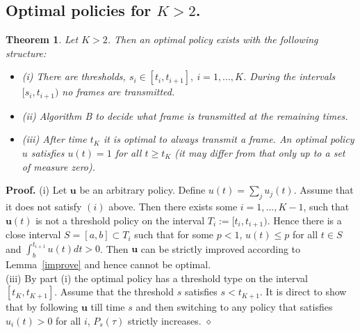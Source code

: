 \documentclass[10pt,twocolumn,conference,final]{IEEEtran}
\def\endpf{\hfill$\diamond$}
\newtheorem{thm}{Theorem}[section]
\newcommand{\ubf}{\mathbf u}
\begin{document}
\subsection{Optimal policies for $K>2$.}
\begin{thm}\label{res3}
Let $K > 2$. Then
an optimal policy exists with the following structure:
\begin{itemize}
\item
(i) There are thresholds, $s_i \in [t_i,t_{i+1}], \ i=1,...,K$. During the
intervals $[s_i,t_{i+1})$ no frames are transmitted.
\item
(ii)  Algorithm B
to decide what frame is transmitted at the remaining times.
\item
(iii) After time $t_K$ it is optimal to always transmit a frame.
An  optimal policy $u$ satisfies $u(t)=1$ for all $t\geq t_K$ (it may
differ from that only up to a set of measure zero).
\end{itemize}
\end{thm}
{\bf Proof.}
(i) Let $\ubf$ be an arbitrary policy.
Define $u(t)=\sum_j u_j(t) $.
Assume that it does not satisfy $(i)$ above.
Then there exists some $i=1,...,K-1$, such that
$\ubf(t)$ is not a threshold policy on the interval
$T_i := [t_i, t_{i+1})$. Hence there is a close interval
$S =[a,b]  \subset T_i$ such that for some $p<1$,
$u(t)\leq p$ for all $t \in S$ and $\int_b^{t_{i+1}} u(t) dt > 0 $.
Then $\ubf$ can be strictly improved according to Lemma~\ref{improve}
and hence cannot be optimal.
\\
(iii)  By part (i) the optimal policy has a threshold type on the interval
$[t_K , t_{K+1}]$. Assume that the threshold $s$ satisfies $s<t_{K+1}$.
It is direct to show that by following $\ubf$ till time $s$ and then switching
to any policy that satisfies $u_i(t)>0$ for all $i$, $P_s(\tau)$
strictly increases.
\endpf
\end{document}
